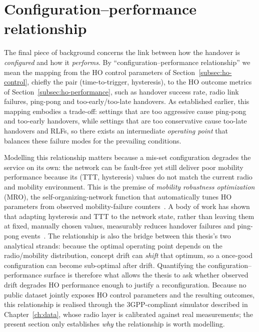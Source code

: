 \section{Configuration--performance relationship}
\label{sec:config-perf}

The final piece of background concerns the link between how the handover is
\emph{configured} and how it \emph{performs}. By ``configuration--performance
relationship'' we mean the mapping from the HO control parameters of
Section~\ref{subsec:ho-control}, chiefly the pair (time-to-trigger,
hysteresis), to the HO outcome metrics of
Section~\ref{subsec:ho-performance}, such as handover success rate, radio link
failures, ping-pong and too-early/too-late handovers. As established earlier,
this mapping embodies a trade-off: settings that are too aggressive cause
ping-pong and too-early handovers, while settings that are too conservative cause
too-late handovers and RLFs, so there exists an intermediate \emph{operating
point} that balances these failure modes for the prevailing conditions.

Modelling this relationship matters because a mis-set configuration degrades the
service on its own: the network can be fault-free yet still deliver poor mobility
performance because its (TTT, hysteresis) values do not match the current radio
and mobility environment. This is the premise of \emph{mobility
robustness optimization} (MRO), the self-organizing-network function that
automatically tunes HO parameters from observed mobility-failure
counters~\cite{tr36839,ts28313}. A body of work has shown that adapting
hysteresis and TTT to the network state, rather than leaving them at fixed,
manually chosen values, measurably reduces handover failures and ping-pong
events~\cite{jansen2010hpo}. The relationship is also the bridge between this
thesis's two analytical strands: because the optimal operating point depends on
the radio/mobility distribution, concept drift can \emph{shift} that optimum, so
a once-good configuration can become sub-optimal after drift. Quantifying the
configuration--performance surface is therefore what allows the thesis to ask
whether observed drift degrades HO performance enough to justify a
reconfiguration. Because no public dataset jointly exposes HO control parameters
and the resulting outcomes, this relationship is realised through the
3GPP-compliant simulator described in Chapter~\ref{ch:data}, whose radio layer
is calibrated against real measurements; the present section only establishes
\emph{why} the relationship is worth modelling.

